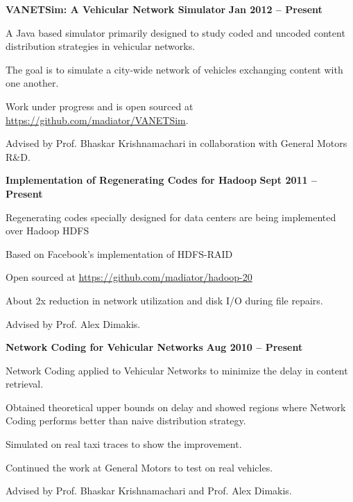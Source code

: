 \documentclass[margin,line]{resume}
\begin{document}
\begin{resume}
  \textbf{VANETSim: A Vehicular Network Simulator} \hfill \textbf{Jan 2012 -- Present}
  \begin{list2}
   \item A Java based simulator primarily designed to study coded and uncoded content distribution strategies in vehicular networks.
   \item The goal is to simulate a city-wide network of vehicles exchanging content with one another. 
   \item Work under progress and is open sourced at \href{https://github.com/madiator/VANETSim}{https://github.com/madiator/VANETSim}.
   \item Advised by Prof. Bhaskar Krishnamachari in collaboration with General Motors R\&D.
  \end{list2}

  \textbf{Implementation of Regenerating Codes for Hadoop} \hfill \textbf{Sept 2011 -- Present}
  \begin{list2}
   \item Regenerating codes specially designed for data centers are being implemented over Hadoop HDFS
   \item Based on Facebook's implementation of HDFS-RAID
   \item Open sourced at \href{https://github.com/madiator/hadoop-20}{https://github.com/madiator/hadoop-20}
   \item About 2x reduction in network utilization and disk I/O during file repairs.
   \item Advised by Prof. Alex Dimakis. 
  \end{list2}
  
  \textbf{Network Coding for Vehicular Networks} \hfill \textbf{Aug 2010 -- Present}
  \begin{list2}
   \item Network Coding applied to Vehicular Networks to minimize the delay in content retrieval. 
   \item Obtained theoretical upper bounds on delay and showed regions where Network Coding performs better than naive distribution strategy.
   \item Simulated on real taxi traces to show the improvement.
   \item Continued the work at General Motors to test on real vehicles. 
   \item Advised by Prof. Bhaskar Krishnamachari and Prof. Alex Dimakis. 
  \end{list2}
  

\end{resume}
\end{document}
